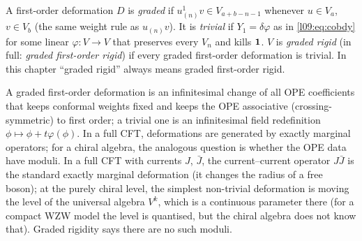 \begin{definition}\label{l09:def:rigid}
A first-order deformation $D$ is \emph{graded} if $u^1_{(n)}v \in V_{a+b-n-1}$ whenever $u\in V_a$,
$v\in V_b$ (the same weight rule as $u_{(n)}v$). It is \emph{trivial} if $Y_1 = \delta\varphi$ as in
\eqref{l09:eq:cobdy} for some linear $\varphi:V\to V$ that preserves every $V_n$ and kills $\mathbf{1}$.
$V$ is \emph{graded rigid} (in full: \emph{graded first-order rigid}) if every graded first-order
deformation is trivial. In this chapter ``graded rigid'' always means graded first-order rigid.
\end{definition}
\begin{physics}
A graded first-order deformation is an infinitesimal change of all OPE coefficients that keeps conformal
weights fixed and keeps the OPE associative (crossing-symmetric) to first order; a trivial one is an
infinitesimal field redefinition $\phi\mapsto\phi + t\varphi(\phi)$. In a full CFT, deformations are generated by
exactly marginal operators; for a chiral algebra, the analogous question is whether the OPE data have
moduli. In a full CFT with currents $J$, $\bar J$, the current--current operator $J\bar J$ is the standard
exactly marginal deformation (it changes the radius of a free boson); at the purely chiral level, the
simplest non-trivial deformation is moving the level of the universal algebra $V^k$, which is a continuous
parameter there (for a compact WZW model the level is quantised, but the chiral algebra does not know that). Graded rigidity says there are no such moduli.
\end{physics}


